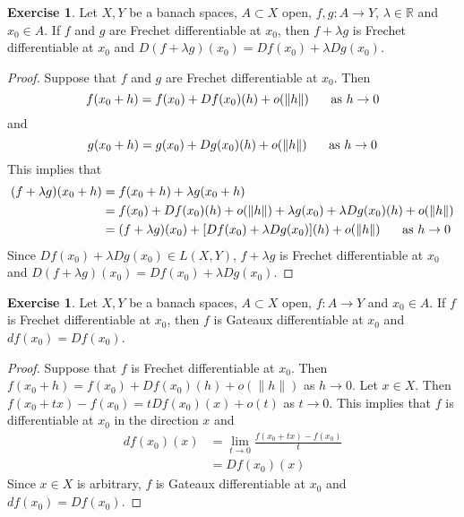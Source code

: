 \documentclass[12pt]{amsart}
\theoremstyle{definition}
\newtheorem{ex}[definition]{Exercise}
\newcommand{\lam}{\lambda}
\newcommand{\R}{\mathbb{R}}
\begin{document}
	\begin{ex}
	Let $X, Y$ be a banach spaces, $A \subset X$ open, $f,g:A \rightarrow Y$, $\lam \in \R$ and $x_0 \in A$. If $f$ and $g$ are Frechet differentiable at $x_0$, then $f+ \lam g$ is Frechet differentiable at $x_0$ and $D(f+\lam g)(x_0) = Df(x_0) + \lam Dg(x_0)$.
	\end{ex}
	
	\begin{proof}
	Suppose that $f$ and $g$ are Frechet differentiable at $x_0$. Then $$f(x_0 + h) = f(x_0) + Df(x_0)(h) + o(\|h\| ) \hspace{.5cm} \text{ as } h \rightarrow 0$$  and $$g(x_0 + h) = g(x_0) + Dg(x_0)(h) + o(\|h\| ) \hspace{.5cm} \text{ as } h \rightarrow 0$$  
	This implies that 
	\begin{align*}
	(f+\lam g)(x_0 + h) 
	&= f(x_0 + h) +\lam g(x_0 + h) \\
	&= f(x_0) + Df(x_0)(h) + o(\|h\| ) + \lam g(x_0) + \lam Dg(x_0)(h) + o(\|h\| ) \\
	&= (f+\lam g)(x_0) + [Df(x_0)+ \lam Dg(x_0)](h) + o(\|h\|) \hspace{.5cm} \text{ as } h \rightarrow 0
	\end{align*}
	Since $Df(x_0)+\lam Dg(x_0) \in L(X,Y)$, $f+\lam g$ is Frechet differentiable at $x_0$ and $D(f+\lam g)(x_0) = Df(x_0) + \lam Dg(x_0)$. 
	\end{proof}
	
	\begin{ex}
	Let $X, Y$ be a banach spaces, $A \subset X$ open, $f:A \rightarrow Y$ and $x_0 \in A$. If $f$ is Frechet differentiable at $x_0$, then $f$ is Gateaux differentiable at $x_0$ and $df(x_0) = Df(x_0)$.
	\end{ex}
	
	\begin{proof}
	Suppose that $f$ is Frechet differentiable at $x_0$. Then $f(x_0 + h) = f(x_0) + Df(x_0)(h) + o(\|h\| )$ as $h \rightarrow 0$. Let $x \in X$. Then $f(x_0 + tx) - f(x_0) = tDf(x_0)(x) + o(t)$ as $t \rightarrow 0$. This implies that $f$ is differentiable at $x_0$ in the direction $x$ and 
	\begin{align*}
	df(x_0)(x) 
	&= \lim_{t \rightarrow 0} \frac{f(x_0 + tx) - f(x_0)}{t} \\
	&= Df(x_0)(x)
	\end{align*}
	Since $x \in X$ is arbitrary, $f$ is Gateaux differentiable at $x_0$ and $df(x_0) = Df(x_0)$.
	\end{proof}
	
\end{document}
